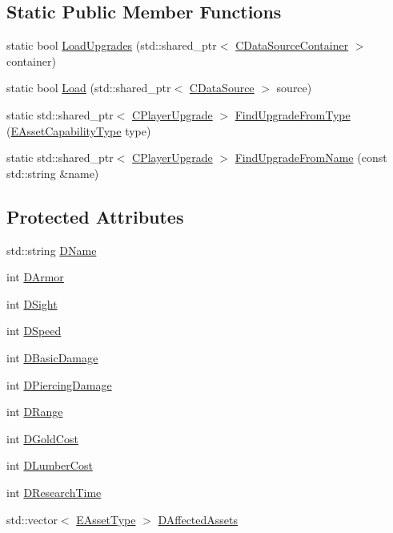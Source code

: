 \subsection*{Static Public Member Functions}
\begin{DoxyCompactItemize}
\item 
static bool \hyperlink{classCPlayerUpgrade_a9bef3d3f2866cd555a9b175426e953d6}{Load\+Upgrades} (std\+::shared\+\_\+ptr$<$ \hyperlink{classCDataSourceContainer}{C\+Data\+Source\+Container} $>$ container)
\item 
static bool \hyperlink{classCPlayerUpgrade_a685fab69765ef63952cdbcaa6b1b927b}{Load} (std\+::shared\+\_\+ptr$<$ \hyperlink{classCDataSource}{C\+Data\+Source} $>$ source)
\item 
static std\+::shared\+\_\+ptr$<$ \hyperlink{classCPlayerUpgrade}{C\+Player\+Upgrade} $>$ \hyperlink{classCPlayerUpgrade_a05c0124e952cc3f52108bdf6d2b76192}{Find\+Upgrade\+From\+Type} (\hyperlink{GameDataTypes_8h_a35b98ce26aca678b03c6f9f76e4778ce}{E\+Asset\+Capability\+Type} type)
\item 
static std\+::shared\+\_\+ptr$<$ \hyperlink{classCPlayerUpgrade}{C\+Player\+Upgrade} $>$ \hyperlink{classCPlayerUpgrade_af47a08aba3a1a5b2cefacef24065a82e}{Find\+Upgrade\+From\+Name} (const std\+::string \&name)
\end{DoxyCompactItemize}
\subsection*{Protected Attributes}
\begin{DoxyCompactItemize}
\item 
std\+::string \hyperlink{classCPlayerUpgrade_a1ea2a137ee148c976ee6daef129a6e11}{D\+Name}
\item 
int \hyperlink{classCPlayerUpgrade_af6ec93ed116043353690363f46957eef}{D\+Armor}
\item 
int \hyperlink{classCPlayerUpgrade_ad07eacdeddddd94cf9766dc04d380b55}{D\+Sight}
\item 
int \hyperlink{classCPlayerUpgrade_a3907be12aac44c8606d1d3542446ecdc}{D\+Speed}
\item 
int \hyperlink{classCPlayerUpgrade_a914ae5e3de84921eaf060b5696478489}{D\+Basic\+Damage}
\item 
int \hyperlink{classCPlayerUpgrade_a295d68f988ae198c66d96793824ca332}{D\+Piercing\+Damage}
\item 
int \hyperlink{classCPlayerUpgrade_a88aff53c9fb5d3bddfd69d1aced8dbaf}{D\+Range}
\item 
int \hyperlink{classCPlayerUpgrade_ab542fa525d263bf54ee75bddb486471c}{D\+Gold\+Cost}
\item 
int \hyperlink{classCPlayerUpgrade_a3c671aceeaeec746fc5ab3c9de28194b}{D\+Lumber\+Cost}
\item 
int \hyperlink{classCPlayerUpgrade_ae233bf472f72c8f16a6f1b1ea3b78012}{D\+Research\+Time}
\item 
std\+::vector$<$ \hyperlink{GameDataTypes_8h_a5600d4fc433b83300308921974477fec}{E\+Asset\+Type} $>$ \hyperlink{classCPlayerUpgrade_adf7bd5e0d37611eb17cccd4ffa789ae6}{D\+Affected\+Assets}
\end{DoxyCompactItemize}
